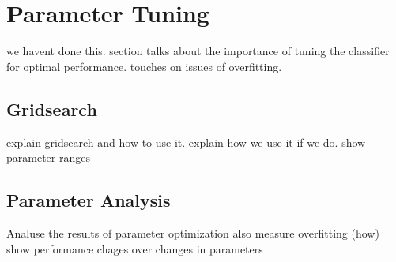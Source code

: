 \section{Parameter Tuning}
we havent done this.
section talks about the importance of tuning the classifier for
optimal performance.
touches on issues of overfitting.

\subsection{Gridsearch}
explain gridsearch and how to use it.
explain how we use it if we do.
show parameter ranges

\subsection{Parameter Analysis}
Analuse the results of parameter optimization
also measure overfitting (how)
show performance chages over changes in parameters
